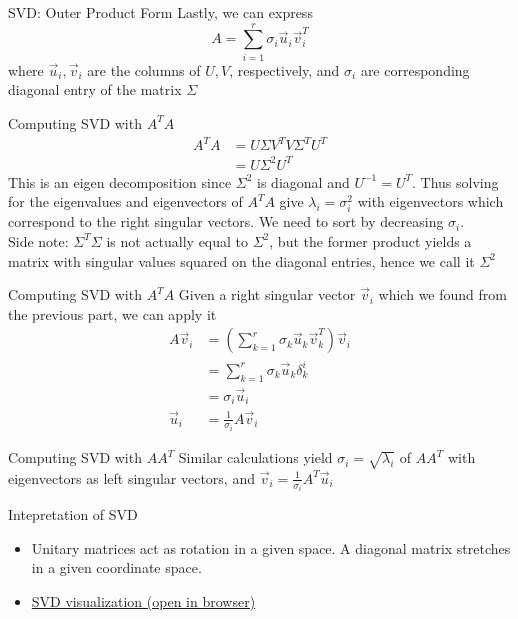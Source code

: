 \documentclass{beamer}
\begin{document}
\begin{frame}{SVD: Outer Product Form}
Lastly, we can express
\[ A = \sum_{i = 1}^r \sigma_i \vec{u}_i \vec{v}_i^T \]
where $\vec{u}_i, \vec{v}_i$ are the columns of $U, V$, respectively, and $\sigma_i$ are corresponding diagonal entry of the matrix $\Sigma$
\end{frame}

\begin{frame}{Computing SVD with $A^T A$}
\begin{align*}
A^T A &= U \Sigma V^T V \Sigma^T U^T \\
&= U \Sigma^2 U^T
\end{align*}
This is an eigen decomposition since $\Sigma^2$ is diagonal and $U^{-1} = U^T$. Thus solving for the eigenvalues and eigenvectors of $A^T A$ give $\lambda_i = \sigma_i^2$ with eigenvectors which correspond to the right singular vectors. We need to sort by decreasing $\sigma_i$. \\

\alert{Side note:} $\Sigma^T \Sigma$ is not actually equal to $\Sigma^2$, but the former product yields a matrix with singular values squared on the diagonal entries, hence we call it $\Sigma^2$
\end{frame}

\begin{frame}{Computing SVD with $A^T A$}
Given a right singular vector $\vec{v}_i$ which we found from the previous part, we can apply it
\begin{align*}
A \vec{v}_i &= \left( \sum_{k = 1}^r \sigma_k \vec{u}_k \vec{v}_k^T \right) \vec{v}_i \\
&= \sum_{k = 1}^r \sigma_k \vec{u}_k \delta_k^i \\
&= \sigma_i \vec{u}_i \\
\vec{u}_i &= \frac{1}{\sigma_i} A \vec{v}_i
\end{align*}
\end{frame}

\begin{frame}{Computing SVD with $A A^T$}
Similar calculations yield $\sigma_i = \sqrt{\lambda_i}$ of $A A^T$ with eigenvectors as left singular vectors, and $\vec{v}_i = \frac{1}{\sigma_i} A^T \vec{u}_i$
\end{frame}

\begin{frame}{Intepretation of SVD}
\begin{itemize}
\item Unitary matrices act as rotation in a given space. A diagonal matrix stretches in a given coordinate space.

\item \href{https://en.wikipedia.org/wiki/File:Singular_value_decomposition.gif}{SVD visualization (open in browser)}
\end{itemize}
\end{frame}
\end{document}
